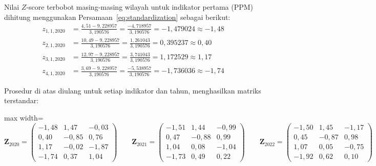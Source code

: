 \begin{enumerate}
    Nilai $Z$-score terbobot masing-masing wilayah untuk indikator pertama (PPM) dihitung menggunakan Persamaan~\ref{eq:standardization} sebagai berikut:
    \begin{align*}
        z_{1,1,2020} &= \frac{4{,}51 - 9{,}228957}{3{,}190576} = \frac{-4{,}718957}{3{,}190576} = -1{,}479024 \approx -1{,}48 \\[4pt]
        z_{2,1,2020} &= \frac{10{,}49 - 9{,}228957}{3{,}190576} = \frac{1{,}261043}{3{,}190576} = 0{,}395237 \approx 0{,}40 \\[4pt]
        z_{3,1,2020} &= \frac{12{,}97 - 9{,}228957}{3{,}190576} = \frac{3{,}741043}{3{,}190576} = 1{,}172529 \approx 1{,}17 \\[4pt]
        z_{4,1,2020} &= \frac{3{,}69 - 9{,}228957}{3{,}190576} = \frac{-5{,}538957}{3{,}190576} = -1{,}736036 \approx -1{,}74
    \end{align*}
\end{enumerate}
Prosedur di atas diulang untuk setiap indikator dan tahun, menghasilkan matriks terstandar:
\begin{center}
\begin{adjustbox}{max width=\textwidth}
$\displaystyle
\mathbf{Z}_{2020} = \begin{pmatrix}
-1,48 & 1,47 & -0,03 \\
0,40 & -0,85 & 0,76 \\
1,17 & -0,02 & -1,87 \\
-1,74 & 0,37 & 1,04
\end{pmatrix}
\qquad
\mathbf{Z}_{2021} = \begin{pmatrix}
-1,51 & 1,44 & -0,99 \\
0,47 & -0,88 & 0,99 \\
1,04 & 0,08 & -1,04 \\
-1,73 & 0,49 & 0,22
\end{pmatrix}
\qquad
\mathbf{Z}_{2022} = \begin{pmatrix}
-1,50 & 1,45 & -1,17 \\
0,45 & -0,87 & 0,98 \\
1,07 & 0,05 & -0,75 \\
-1,92 & 0,62 & 0,10
\end{pmatrix}
$
\end{adjustbox}
\end{center}

